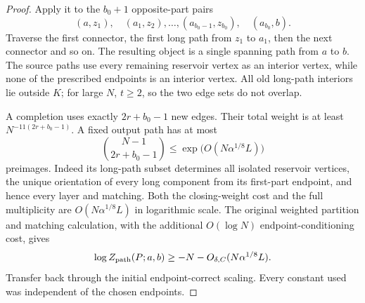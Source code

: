 \begin{proof}
Apply it to the \(b_0+1\) opposite-part pairs
\[
 (a,z_1),\quad
 (a_1,z_2),\ldots,(a_{b_0-1},z_{b_0}),\quad(a_{b_0},b).
\]
Traverse the first connector, the first long path from
\(z_1\) to \(a_1\), then the next connector and so on.
The resulting object is a single spanning path from \(a\)
to \(b\). The source paths use every remaining reservoir
vertex as an interior vertex, while none of the prescribed
endpoints is an interior vertex.
All old long-path interiors lie outside \(K\);
for large \(N\), \(t\geq2\), so the two edge sets do not overlap.

A completion uses exactly \(2r+b_0-1\) new edges.
Their total weight is at least
\(N^{-11(2r+b_0-1)}\).
A fixed output path has at most
\[
 \binom{N-1}{2r+b_0-1}
       \leq\exp\bigl(O(N\alpha^{1/8}L)\bigr)
\]
preimages. Indeed its long-path subset determines all
isolated reservoir vertices, the unique orientation of
every long component from its first-part endpoint, and
hence every layer and matching.
Both the closing-weight cost and the full multiplicity
are \(O(N\alpha^{1/8}L)\) in logarithmic scale.
The original weighted partition and matching calculation,
with the additional \(O(\log N)\) endpoint-conditioning
cost, gives
\[
 \log Z_{\rm path}(P;a,b)
       \geq-N-O_{\delta,C}(N\alpha^{1/8}L).
\]
Transfer back through the initial endpoint-correct scaling.
Every constant used was independent of the chosen endpoints.
\end{proof}
